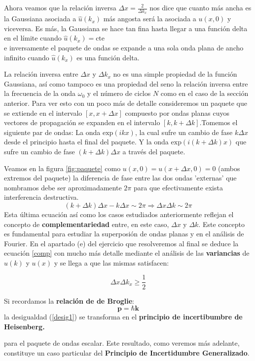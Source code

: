 \begin{resultados}{}
Ahora veamos que la relación inversa $\Delta x = \frac{2}{\Delta k_x}$ nos dice que cuanto más ancha es la Gaussiana asociada a $\hat{u}(k_x)$ más angosta será la asociada a $u(x,0)$ y viceversa. Es más, la Gaussiana se hace tan fina hasta llegar a una función delta en el límite cuando $\hat{u}(k_x)=\text{cte}$\\ e inversamente el paquete de ondas se expande a una sola onda plana de ancho infinito cuando $\hat{u}(k_x)$ es una función delta.
\end{resultados}


\vspace{0.5cm}

La relación inversa entre $\Delta x$ y $\Delta k_x$ no es una simple propiedad de la función Gaussiana, así como tampoco es una propiedad del seno la relación inversa entre la frecuencia de la onda $\omega_0$ y el número de ciclos $N$ como en el caso de la sección anterior. Para ver esto con un poco más de detalle consideremos un paquete que se extiende en el intervalo $[x, x+\Delta x]$ compuesto por ondas planas cuyos vectores de propagación se expanden en el intervalo $[k,k+\Delta k]$.Tomemos el siguiente par de ondas: La onda $\mathrm{exp}(ikx)$, la cual sufre un cambio de fase $k\Delta x$ desde el principio hasta el final del paquete. Y la onda  $\mathrm{exp}(i(k+\Delta k)x)$ que sufre un cambio de fase $(k+\Delta k)\Delta x$ a través del paquete.

Veamos en la figura \ref{fig:paquete} como $u(x,0) = u(x+\Delta x,0)= 0$ (ambos extremos del paquete) la diferencia de fase entre las dos ondas 'externas' que nombramos debe ser aproximadamente $2\pi$ para que efectivamente exista interferencia destructiva.
\begin{equation}
    (k+\Delta k)\Delta x - k\Delta x \sim 2 \pi \Rightarrow \Delta x\Delta k \sim 2\pi
    \label{comp}
\end{equation}
Esta última ecuación así como los casos estudiados anteriormente reflejan el concepto de \textbf{complementariedad} entre, en este caso, $\Delta x$ y $\Delta k$. Este concepto es fundamental para estudiar la superposión de ondas planas y en el análisis de Fourier. En el apartado (e) del ejercicio que resolveremos al final se deduce la ecuación \ref{comp} con mucho más detalle mediante el análisis de las \textbf{variancias} de $\hat{u}(k)$ y $u(x)$ y se llega a que las mismas satisfacen:

\begin{equation}\label{desig1}
    \Delta x\Delta k_x \geq \frac{1}{2}
\end{equation}
\begin{marginfigure}
\begin{qbox}{}
   Si recordamos la \textbf{relación de de Broglie}:
   $$\mathbf{p}=\hbar\mathbf{k}$$
   la desigualdad (\ref{desig1}) se transforma en el \textbf{principio de incertibumbre de Heisenberg.}
\end{qbox}

\end{marginfigure}
para el paquete de ondas escalar. Este resultado, como veremos más adelante, constituye un caso particular del \textbf{Principio de Incertidumbre Generalizado}.
 

